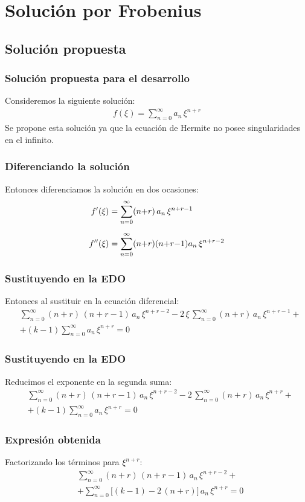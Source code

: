 \documentclass[12pt]{beamer}
\begin{document}
\section{Solución por Frobenius}
\subsection{Solución propuesta}

\begin{frame}
\frametitle{Solución propuesta para el desarrollo}
Consideremos la siguiente solución:
\pause
\begin{align*}
f(\xi) = \sum_{n=0}^{\infty} a_{n} \, \xi^{n+r}
\end{align*}
\pause
Se propone esta solución ya que la ecuación de Hermite no posee singularidades en el infinito.
\end{frame}
\begin{frame}
\frametitle{Diferenciando la solución}
Entonces diferenciamos la solución en dos ocasiones:
\pause
\begin{align*}
{f}^{\prime}(\xi) &= \sum_{n=0}^{\infty} (n {+} r) \, a_{n} \, \xi^{n+r-1} \\[0.5em]
{f}^{\prime \prime}(\xi) &= \sum_{n=0}^{\infty} (n {+} r)(n {+} r {-} 1) a_{n} \,  \xi^{n+r-2} 
\end{align*}
\end{frame}
\begin{frame}
\frametitle{Sustituyendo en la EDO}
Entonces al sustituir en la ecuación diferencial:
\pause
\begin{align*}
&\sum_{n=0}^{\infty} (n {+} r) \, (n {+} r {-} 1) \, a_{n} \, \xi^{n+r-2} - 2 \, \xi \, \sum_{n=0}^{\infty} (n {+} r) \, a_{n} \,  \xi^{n+r-1} + \\[0.3em]
&+ (k {-} 1) \sum_{n=0}^{\infty} a_{n} \, \xi^{n+r} = 0
\end{align*}
\end{frame}
\begin{frame}
\frametitle{Sustituyendo en la EDO}
Reducimos el exponente en la segunda suma:
\pause
\begin{align*}
&\sum_{n=0}^{\infty} (n {+} r) \, (n {+} r {-} 1) \, a_{n} \,  \xi^{n+r-2} - 2 \, \sum_{n=0}^{\infty} (n {+} r) \, a_{n} \,  \xi^{n+r} + \\[0.3em]
&+ (k {-} 1) \sum_{n=0}^{\infty} a_{n} \, \xi^{n+r} = 0
\end{align*}    
\end{frame}
\begin{frame}
\frametitle{Expresión obtenida}
Factorizando los términos para $\xi^{n+r}$:
\pause
\begin{align*}
&\sum_{n=0}^{\infty} (n {+} r) \, (n {+} r {-} 1) \, a_{n}  \, \xi^{n+r-2} + \\[0.5em] 
&+ \sum_{n=0}^{\infty} \bigg[ (k {-} 1) {-} 2 \, (n {+} r) \bigg] \, a_{n} \,  \xi^{n+r}  = 0
\end{align*}
\end{frame}
\end{document}
